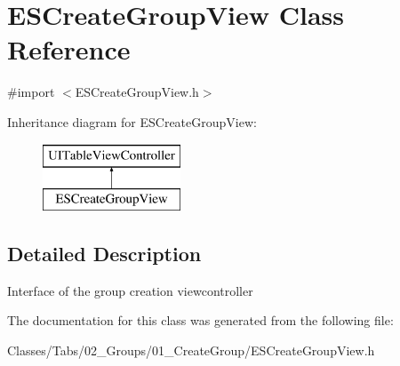 \hypertarget{interface_e_s_create_group_view}{}\section{E\+S\+Create\+Group\+View Class Reference}
\label{interface_e_s_create_group_view}


{\ttfamily \#import $<$E\+S\+Create\+Group\+View.\+h$>$}

Inheritance diagram for E\+S\+Create\+Group\+View\+:\begin{figure}[H]
\begin{center}
\leavevmode
\includegraphics[height=2.000000cm]{interface_e_s_create_group_view}
\end{center}
\end{figure}


\subsection{Detailed Description}
Interface of the group creation viewcontroller 

The documentation for this class was generated from the following file\+:\begin{DoxyCompactItemize}
\item 
Classes/\+Tabs/02\+\_\+\+Groups/01\+\_\+\+Create\+Group/E\+S\+Create\+Group\+View.\+h\end{DoxyCompactItemize}
